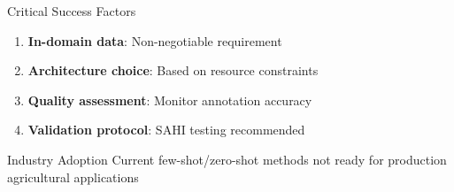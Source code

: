 \documentclass[aspectratio=43]{beamer}
\begin{document}
\begin{frame}
\begin{columns}
        \begin{column}{0.5\textwidth}
            \begin{block}{Critical Success Factors}
                \small
                \begin{enumerate}
                    \item \textbf{In-domain data}: Non-negotiable requirement
                    \item \textbf{Architecture choice}: Based on resource constraints
                    \item \textbf{Quality assessment}: Monitor annotation accuracy
                    \item \textbf{Validation protocol}: SAHI testing recommended
                \end{enumerate}
            \end{block}
            
            \begin{alertblock}{Industry Adoption}
                \scriptsize Current few-shot/zero-shot methods not ready for production agricultural applications
            \end{alertblock}
        \end{column}
    \end{columns}
\end{frame}
\end{document}
